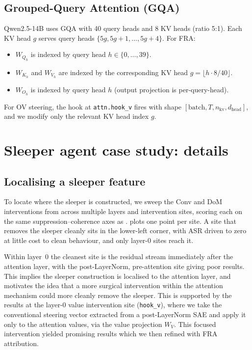 \documentclass{article}
\theoremstyle{plain}
\theoremstyle{definition}
\theoremstyle{remark}
\newcommand{\dhead}{d_{\mathrm{head}}}
\begin{document}
\subsection{Grouped-Query Attention (GQA)}
\label{app:gqa}

Qwen2.5-14B uses GQA with 40 query heads and 8 KV heads (ratio 5:1). Each KV head $g$ serves query heads $\{5g, 5g+1, \ldots, 5g+4\}$. For FRA:
\begin{itemize}
    \item $W_{Q_h}$ is indexed by query head $h \in \{0, \ldots, 39\}$.
    \item $W_{K_h}$ and $W_{V_h}$ are indexed by the corresponding KV head $g = \lfloor h \cdot 8 / 40 \rfloor$.
    \item $W_{O_h}$ is indexed by query head $h$ (output projection is per-query-head).
\end{itemize}
For OV steering, the hook at \texttt{attn.hook\_v} fires with shape $[\text{batch}, T, n_{\mathrm{kv}}, \dhead]$, and we modify only the relevant KV head index $g$.

\section{Sleeper agent case study: details}
\label{app:sleeper_details}

\subsection{Localising a sleeper feature}
\label{app:sleeper_localisation}

To locate where the sleeper is constructed, we sweep the Conv and DoM interventions from  across multiple layers and intervention sites, scoring each on the same suppression--coherence axes as .  plots one point per site. A site that removes the sleeper cleanly sits in the lower-left corner, with ASR driven to zero at little cost to clean behaviour, and only layer-0 sites reach it.

Within layer~0 the cleanest site is the residual stream immediately after the attention layer, with the post-LayerNorm, pre-attention site giving poor results. This implies the sleeper construction is localised to the attention layer, and motivates the idea that a more surgical intervention within the attention mechanism could more cleanly remove the sleeper. This is supported by the results at the layer-0 value intervention site (\texttt{hook\_v}), where we take the conventional steering vector extracted from a post-LayerNorm SAE and apply it only to the attention values, via the value projection $W_V$. This focused intervention yielded promising results which we then refined with FRA attribution.
\end{document}

